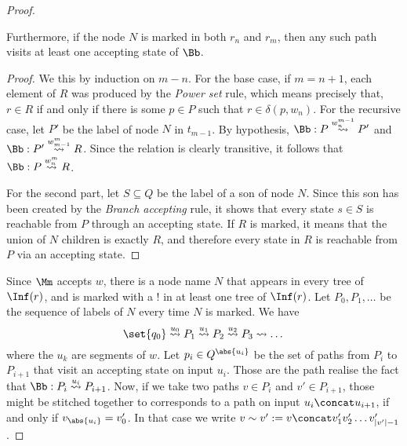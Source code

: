 \begin{proof}
\begin{claim}
        Furthermore, if the node $N$ is marked in both $r_n$
        and $r_m$, then any such path visits
        at least one accepting state of $\Bb$.
    \end{claim}
    \begin{proof}
        We this by induction on $m - n$. For the base case,
        if $m = n + 1$, each element of $R$ was produced by the \textit{Power set}
        rule, which means precisely that, $r \in R$ if and only if
        there is some $p \in P$ such that $r \in \delta(p, w_n)$.
        For the recursive case, let $P'$ be the label of node $N$ in
        $t_{m-1}$. By hypothesis, $\Bb : P \pathto{w_n^{m-1}} P'$
        and $\Bb : P' \pathto{w_{m-1}^m} R$. Since the relation is clearly
        transitive, it follows that $\Bb : P \pathto{w_n^m} R$.

        For the second part, let $S \subseteq Q$
        be the label of a son of node $N$. Since this son
        has been created by the \textit{Branch accepting} rule,
        it shows that every state $s \in S$ is reachable from $P$
        through an accepting state. If $R$ is marked, it means
        that the union of $N$ children is exactly $R$, and therefore
        every state in $R$ is reachable from $P$ via an accepting state.
    \end{proof}

    Since $\Mm$ accepts $w$,
    there is a node name $N$ that appears in every
    tree of $\Inf(r)$, and is marked with a $!$ in
    at least one tree of $\Inf(r)$.
    Let $P_0, P_1, \dots$ be the sequence of labels of $N$
    every time $N$ is marked. We have
    \[
        \set{q_0} \pathto{u_0} P_1 \pathto{u_1} P_2 \pathto{u_2} P_3 \pathto{} \dots
    \]
    where the $u_k$ are segments of $w$.
    Let $p_i \in Q^{\abs{u_i}}$ be the set of paths from $P_i$ to $P_{i+1}$
    that visit an accepting state on input $u_i$.
    Those are the path realise the fact that $\Bb : P_i \pathto{u_i} P_{i+1}$.
    Now, if we take two paths $v \in P_i$ and $v' \in P_{i+1}$,
    those might be stitched together to corresponds to
    a path on input $u_i \concat u_{i+1}$, if and only if
    $v_{\abs{u_i}} = v'_0$. In that case we write $v \sim v' :=
    v \concat v'_1 v'_2 \dots v'_{|v'|-1}$.


\end{proof}
